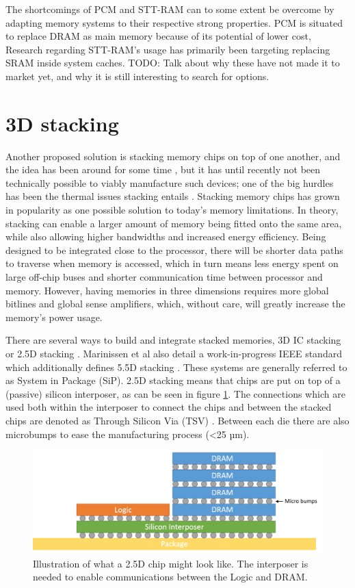 The shortcomings of PCM and STT-RAM can to some extent be overcome by adapting memory systems to their respective strong properties. PCM is situated to replace DRAM as main memory because of its potential of lower cost, 
Research regarding STT-RAM's usage has primarily been targeting replacing SRAM inside system caches. 
TODO: Talk about why these have not made it to market yet, and why it is still interesting to search for options.

\section{3D stacking}
Another proposed solution is stacking memory chips on top of one another, and the idea has been around for some time \cite{lee2000three}\cite{jacob2005predicting}\cite{black2006stacking}, but it has until recently not been technically possible to viably manufacture such devices; one of the big hurdles has been the thermal issues stacking entails \cite{5074080}. Stacking memory chips has grown in popularity as one possible solution to today's memory limitations. In theory, stacking can enable a larger amount of memory being fitted onto the same area, while also allowing higher bandwidths and increased energy efficiency\cite{Lee:2016:SMA:2836331.2832911}. Being designed to be integrated close to the processor, there will be shorter data paths to traverse when memory is accessed, which in turn means less energy spent on large off-chip buses and shorter communication time between processor and memory. However, having memories in three dimensions requires more global bitlines and global sense amplifiers, which, without care, will greatly increase the memory's power usage.
\bigskip

There are several ways to build and integrate stacked memories, 3D IC stacking or 2.5D stacking \cite{6248905}\cite{5702702}\cite{6248842}. Marinissen et al also detail a work-in-progress IEEE standard which additionally defines 5.5D stacking \cite{7519330}. These systems are generally referred to as System in Package (SiP). 2.5D stacking means that chips are put on top of a (passive) silicon interposer, as can be seen in figure \ref{2D-chip}. The connections which are used both within the interposer to connect the chips and between the stacked chips are denoted as Through Silicon Via (TSV) \cite{Lau2018}\cite{lau2012through}. Between each die there are also microbumps to ease the manufacturing process (<25 µm).

\begin{figure}[!h]
\centering
\includegraphics[width=0.75\linewidth]{figure/2D-integration.png}
\caption{Illustration of what a 2.5D chip might look like. The interposer is needed to enable communications between the Logic and DRAM. }
\label{2D-chip}
\end{figure}

